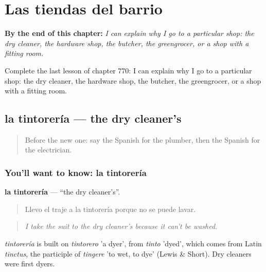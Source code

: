 
\chapter{Las tiendas del barrio}
\label{ch:es-las-tiendas-del-barrio}

\begin{chapteropening}
\textbf{By the end of this chapter:} \emph{I can explain why I go to a particular shop: the dry cleaner, the hardware shop, the butcher, the greengrocer, or a shop with a fitting room.}

Complete the last lesson of chapter 770: I can explain why I go to a particular shop: the dry cleaner, the hardware shop, the butcher, the greengrocer, or a shop with a fitting room.
\end{chapteropening}

\section[la tintorería]{la tintorería — the dry cleaner's}

\label{lesson:ES-C770-tintoreria}



\begin{quote}
Before the new one: say the Spanish for the plumber, then the Spanish for the electrician.
\end{quote}

\subsection*{You'll want to know: la tintorería}
\textbf{la tintorería} — \textquotedblleft{}the dry cleaner's\textquotedblright{}.

\begin{quote}
Llevo el traje a la tintorería porque no se puede lavar.
\end{quote}

\begin{quote}
\emph{I take the suit to the dry cleaner's because it can't be washed.}
\end{quote}

\begin{cousinweb}
\emph{tintorería} is built on \emph{tintorero} 'a dyer', from \emph{tinto} 'dyed', which comes from Latin \emph{tīnctus}, the participle of \emph{tingere} 'to wet, to dye' (Lewis \& Short). Dry cleaners were first dyers.
\end{cousinweb}

